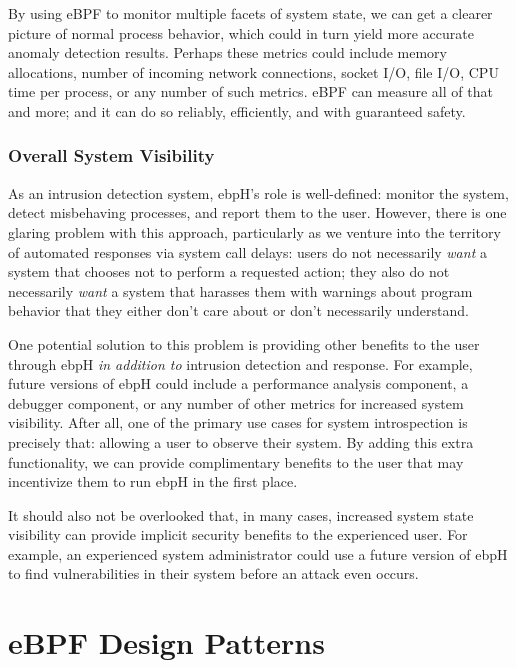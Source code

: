 \documentclass[
  12pt]{findlay}
\begin{document}
By using eBPF to monitor multiple facets of system state, we can get a
clearer picture of normal process behavior, which could in turn yield
more accurate anomaly detection results. Perhaps these metrics could
include memory allocations, number of incoming network connections,
socket I/O, file I/O, CPU time per process, or any number of such
metrics. eBPF can measure all of that and more; and it can do so
reliably, efficiently, and with guaranteed safety.

\hypertarget{overall-system-visibility}{%
\subsubsection{Overall System
Visibility}\label{overall-system-visibility}}

As an intrusion detection system, ebpH's role is well-defined: monitor
the system, detect misbehaving processes, and report them to the user.
However, there is one glaring problem with this approach, particularly
as we venture into the territory of automated responses via system call
delays: users do not necessarily \emph{want} a system that chooses not
to perform a requested action; they also do not necessarily \emph{want}
a system that harasses them with warnings about program behavior that
they either don't care about or don't necessarily understand.

One potential solution to this problem is providing other benefits to
the user through ebpH \emph{in addition to} intrusion detection and
response. For example, future versions of ebpH could include a
performance analysis component, a debugger component, or any number of
other metrics for increased system visibility. After all, one of the
primary use cases for system introspection is precisely that: allowing a
user to observe their system. By adding this extra functionality, we can
provide complimentary benefits to the user that may incentivize them to
run ebpH in the first place.

It should also not be overlooked that, in many cases, increased system
state visibility can provide implicit security benefits to the
experienced user. For example, an experienced system administrator could
use a future version of ebpH to find vulnerabilities in their system
before an attack even occurs.

\clearpage
{}
\printbibliography
\clearpage

\appendix
\appendixpage

\hypertarget{ebpf-design-patterns}{%
\section{eBPF Design Patterns}\label{ebpf-design-patterns}}
\end{document}
